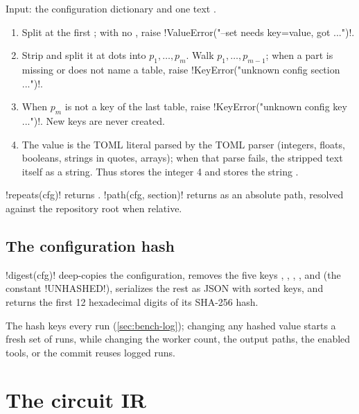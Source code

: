 \begin{algorithm}\label{alg:bench-override}
Input: the configuration dictionary and one text .
\begin{enumerate}
\item Split at the first \code{=}; with no \code{=}, raise \py!ValueError("--set needs key=value, got ...")!.
\item Strip  and split it at dots into $p_1,\dots,p_m$. Walk $p_1,\dots,p_{m-1}$; when
  a part is missing or does not name a table, raise \py!KeyError("unknown config section ...")!.
\item When $p_m$ is not a key of the last table, raise \py!KeyError("unknown config key ...")!.
  New keys are never created.
\item The value is the TOML literal  parsed by the TOML parser (integers,
  floats, booleans, strings in quotes, arrays); when that parse fails, the stripped text itself
  as a string. Thus  stores the integer 4 and  stores the string .
\end{enumerate}
\end{algorithm}

\py!repeats(cfg)! returns .
\py!path(cfg, section)! returns  as an absolute path, resolved
against the repository root when relative.

\subsection{The configuration hash}

\begin{definition}\label{def:bench-digest}
\py!digest(cfg)! deep-copies the configuration, removes the five keys ,
, , , and 
(the constant \py!UNHASHED!), serializes the rest as JSON with sorted keys, and returns the
first 12 hexadecimal digits of its SHA-256 hash.
\end{definition}

The hash keys every run (\cref{sec:bench-log}); changing any hashed value starts a fresh set
of runs, while changing the worker count, the output paths, the enabled tools, or the commit
reuses logged runs.

\section{The circuit IR}\label{sec:bench-ir}

